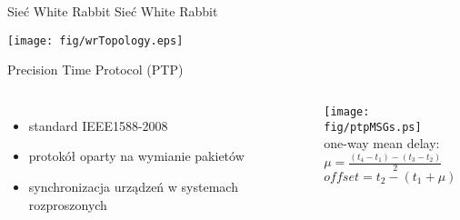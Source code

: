 \documentclass[compress,red]{beamer}
\begin{document}
\begin{frame}{Sieć White Rabbit}
\center Sieć White Rabbit
  \begin{center}
  \texttt{[image: fig/wrTopology.eps]}
  \end{center}
\end{frame}
\begin{frame}{Precision Time Protocol (PTP)}
\begin{columns}[c]
\column{2.8in}

  \begin{itemize}
    \item standard IEEE1588-2008
    \item protokół oparty na wymianie pakietów
    \item synchronizacja urządzeń w systemach rozproszonych
  \end{itemize}

\column{1.5in}
    \texttt{[image: fig/ptpMSGs.ps]} \\
    \small 
    one-way mean delay: \\
    $\mu = \frac{(t_{4}-t_{1}) - (t_{3}-t_{2})}{2}$ \\
    \small 
    $offset = t_{2} - (t_{1} + \mu)$
    
\end{columns}


\end{frame}
\end{document}
